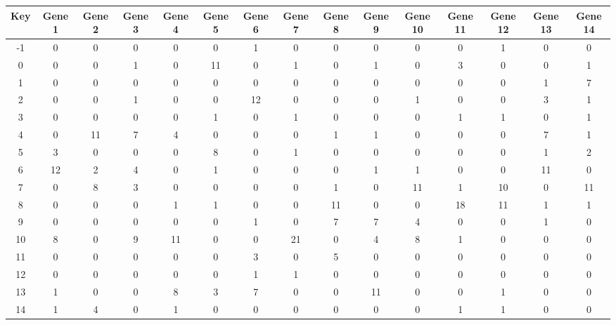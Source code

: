\begin{tabular}{|c|c|c|c|c|c|c|c|c|c|c|c|c|c|c|}
\hline
Key & Gene 1 & Gene 2 & Gene 3 & Gene 4 & Gene 5 & Gene 6 & Gene 7 & Gene 8 & Gene 9 & Gene 10 & Gene 11 & Gene 12 & Gene 13 & Gene 14 \\
\hline
-1 & 0 & 0 & 0 & 0 & 0 & 1 & 0 & 0 & 0 & 0 & 0 & 1 & 0 & 0 \\
0 & 0 & 0 & 1 & 0 & 11 & 0 & 1 & 0 & 1 & 0 & 3 & 0 & 0 & 1 \\
1 & 0 & 0 & 0 & 0 & 0 & 0 & 0 & 0 & 0 & 0 & 0 & 0 & 1 & 7 \\
2 & 0 & 0 & 1 & 0 & 0 & 12 & 0 & 0 & 0 & 1 & 0 & 0 & 3 & 1 \\
3 & 0 & 0 & 0 & 0 & 1 & 0 & 1 & 0 & 0 & 0 & 1 & 1 & 0 & 1 \\
4 & 0 & 11 & 7 & 4 & 0 & 0 & 0 & 1 & 1 & 0 & 0 & 0 & 7 & 1 \\
5 & 3 & 0 & 0 & 0 & 8 & 0 & 1 & 0 & 0 & 0 & 0 & 0 & 1 & 2 \\
6 & 12 & 2 & 4 & 0 & 1 & 0 & 0 & 0 & 1 & 1 & 0 & 0 & 11 & 0 \\
7 & 0 & 8 & 3 & 0 & 0 & 0 & 0 & 1 & 0 & 11 & 1 & 10 & 0 & 11 \\
8 & 0 & 0 & 0 & 1 & 1 & 0 & 0 & 11 & 0 & 0 & 18 & 11 & 1 & 1 \\
9 & 0 & 0 & 0 & 0 & 0 & 1 & 0 & 7 & 7 & 4 & 0 & 0 & 1 & 0 \\
10 & 8 & 0 & 9 & 11 & 0 & 0 & 21 & 0 & 4 & 8 & 1 & 0 & 0 & 0 \\
11 & 0 & 0 & 0 & 0 & 0 & 3 & 0 & 5 & 0 & 0 & 0 & 0 & 0 & 0 \\
12 & 0 & 0 & 0 & 0 & 0 & 1 & 1 & 0 & 0 & 0 & 0 & 0 & 0 & 0 \\
13 & 1 & 0 & 0 & 8 & 3 & 7 & 0 & 0 & 11 & 0 & 0 & 1 & 0 & 0 \\
14 & 1 & 4 & 0 & 1 & 0 & 0 & 0 & 0 & 0 & 0 & 1 & 1 & 0 & 0 \\
\hline
\end{tabular}